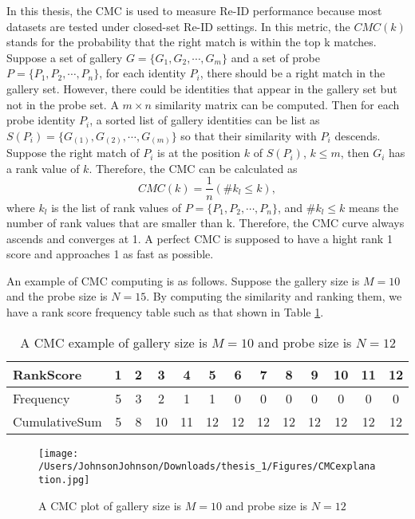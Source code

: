 In this thesis, the CMC is used to measure Re-ID performance because most datasets are tested under closed-set Re-ID settings. In this metric, the $CMC(k)$ stands for the probability that the right match is within the top k matches. Suppose a set of gallery $G = \{G_1,G_2,\cdots,G_m\}$ and a set of probe $P = \{P_1,P_2,\cdots,P_n\}$, for each identity $P_i$, there should be a right match in the gallery set. However, there could be identities that appear in the gallery set but not in the probe set. A $m\times n$ similarity matrix can be computed. Then for each probe identity $P_i$, a sorted list of gallery identities can be list as $S(P_i) = \{{G_{(1)},G_{(2)},\cdots,G_{(m)}}\}$ so that their similarity with $P_i$ descends. Suppose the right match of $P_i$ is at the position $k$ of $S(P_i)$, $k\le m$, then $G_i$ has a rank value of $k$. Therefore, the CMC can be calculated as 
\begin{equation}
CMC(k) = \frac{1}{n}(\#k_l\le k),
\end{equation}
where $k_l$ is the list of rank values of $P = \{P_1,P_2,\cdots,P_n\}$, and $\#k_l\le k$ means the number of rank values that are smaller than k.  Therefore, the CMC curve always ascends and converges at 1.  A perfect CMC is supposed to have a hight rank 1 score and approaches 1 as fast as possible.

An example of CMC computing is as follows. Suppose the gallery size is $M=10$ and the probe size is $N=15$. By computing the similarity and ranking them, we have a rank score frequency table such  as that shown in Table \ref{CMCcomputingdemo}.
\begin{table}[H]
\centering
\caption{A CMC example of gallery size is $M=10$ and probe size is $N=12$}
\label{CMCcomputingdemo}
\begin{tabular}{|l|c|c|c|c|c|c|c|c|c|c|c|c|}
\hline
RankScore &1&2&3&4&5&6&7&8&9&10&11&12\\
\hline
Frequency &5&3&2&1&1&0&0&0&0&0&0&0\\
\hline
CumulativeSum&5&8&10&11&12&12&12&12&12&12&12&12\\
\hline
\end{tabular}
\end{table}

\begin{figure}[H]
\centering
\texttt{[image: /Users/JohnsonJohnson/Downloads/thesis\_1/Figures/CMCexplanation.jpg]}
\caption{A CMC plot of  gallery size is $M=10$ and probe size is $N=12$}
\label{CMCexplanationplot}
\vspace{-1em}
\end{figure} 






